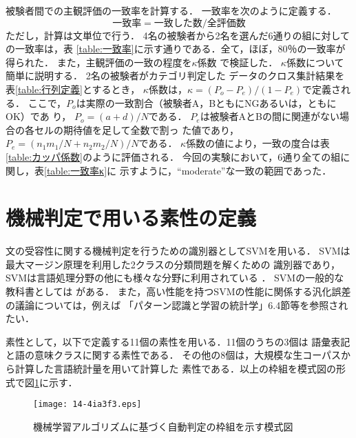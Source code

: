 \documentclass[japanese]{jnlp_1.3e}
\begin{document}
被験者間での主観評価の一致率を計算する．
一致率を次のように定義する．
\begin{equation}
 一致率 = 一致した数 / 全評価数
\end{equation}
ただし，計算は文単位で行う．
4名の被験者から2名を選んだ6通りの組に対しての一致率は，表
\ref{table:一致率}に示す通りである．全て，ほぼ，80{\kern0pt}％の一致率が得られた．
また，主観評価の一致の程度を$\kappa$係数
\cite{kappa}\cite{kappa2}で検証した．
$\kappa$係数について簡単に説明する．
2名の被験者がカテゴリ判定した
データのクロス集計結果を表\ref{table:行列定義}とするとき，
$\kappa$係数は，$\kappa=(P_o - P_e)/(1 - P_e)$で定義される．
ここで，$P_o$は実際の一致割合（被験者A，BともにNGあるいは，ともにOK）であ
り，
$P_o=(a + d)/N$である．
$P_e$は被験者AとBの間に関連がない場合の各セルの期待値を足して全数で割っ
た値であり，
$P_e = (n_1 m_1 / N + n_2 m_2 / N)/N$である．
$\kappa$係数の値により，一致の度合は表\ref{table:カッパ係数}のように評価される．
今回の実験において，6通り全ての組に関し，表\ref{table:一致率κ}に
示すように，``moderate''な一致の範囲であった．

\begin{table}[t]

\end{table}

\begin{table}[t]

\end{table}

\section{機械判定で用いる素性の定義}
\label{label:機械判定用の素性定義}

文の受容性に関する機械判定を行うための識別器としてSVMを用いる．
SVMは最大マージン原理を利用した2クラスの分類問題を解くための
識別器であり，SVMは言語処理分野の他にも様々な分野に利用されている
\cite{SVMapplication}．
SVMの一般的な教科書としては
\cite{Cristianini}\cite{Vapnik}
がある．
また，高い性能を持つSVMの性能に関係する汎化誤差の議論については，例えば
「パターン認識と学習の統計学」6.4節\cite{Aso}等を参照されたい．

素性として，以下で定義する11個の素性を用いる．11個のうちの3個は
語彙表記と語の意味クラスに関する素性である．
その他の8個は，大規模な生コーパスから計算した言語統計量を用いて計算した
素性である．以上の枠組を模式図の形式で図\ref{fig:機械判定の枠組}に示す．

\begin{figure}[t]
  \begin{center}
    \texttt{[image: 14-4ia3f3.eps]}
  \end{center}
  \caption{機械学習アルゴリズムに基づく自動判定の枠組を示す模式図}
  \label{fig:機械判定の枠組}
\end{figure}
\end{document}

